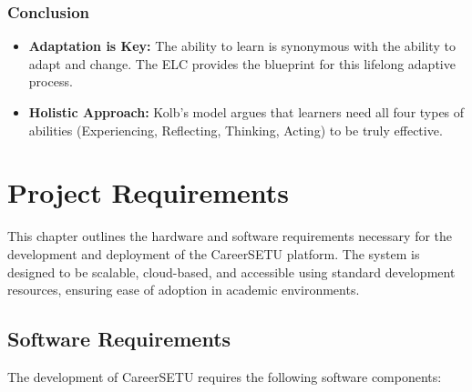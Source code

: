 \documentclass[12pt,a4paper]{report}
\begin{document}
\subsection{Conclusion}
\begin{itemize}
  \item \textbf{Adaptation is Key:} The ability to learn is synonymous with the ability to adapt and change. The ELC provides the blueprint for this lifelong adaptive process.
  \item \textbf{Holistic Approach:} Kolb's model argues that learners need all four types of abilities (Experiencing, Reflecting, Thinking, Acting) to be truly effective.
\end{itemize}




\chapter{Project Requirements}

This chapter outlines the hardware and software requirements necessary for the
development and deployment of the CareerSETU platform. The system is designed to be
scalable, cloud-based, and accessible using standard development resources, ensuring
ease of adoption in academic environments.

\section{Software Requirements}

The development of CareerSETU requires the following software components:
\end{document}
